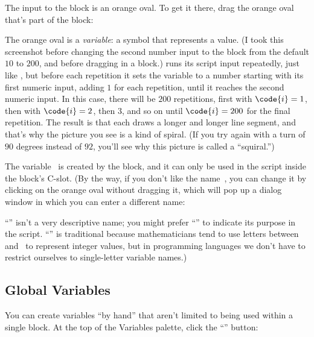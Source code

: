 \documentclass{report}
\begin{document}

The input to the  block is an orange oval. To get it there, drag the orange oval that's part of the  block:\nopagebreak


The orange oval is a \emph{variable}: a symbol that represents a value. (I took this screenshot before changing the second number input to the  block from the default $10$ to $200$, and before dragging in a  block.)  runs its script input repeatedly, just like , but before each repetition it sets the variable  to a number starting with its first numeric input, adding $1$ for each repetition, until it reaches the second numeric input. In this case, there will be $200$ repetitions, first with $\code{i}=1$, then with $\code{i}=2$, then $3$, and so on until $\code{i}=200$ for the final repetition. The result is that each  draws a longer and longer line segment, and that's why the picture you see is a kind of spiral. (If you try again with a turn of $90$ degrees instead of $92$, you'll see why this picture is called a ``squiral.'')

The variable~ is created by the  block, and it can only be used in the script inside the block's C-slot. (By the way, if you don't like the name~, you can change it by clicking on the orange oval without dragging it, which will pop up a dialog window in which you can enter a different name:\nopagebreak


``'' isn't a very descriptive name; you might prefer ``'' to indicate its purpose in the script. ``'' is traditional because mathematicians tend to use letters between~ and~ to represent integer values, but in programming languages we don't have to restrict ourselves to single-letter variable names.)

\subsection{Global Variables}

You can create variables ``by hand'' that aren't limited to being used within a single block. At the top of the Variables palette, click the ``'' button:\nopagebreak

\end{document}
